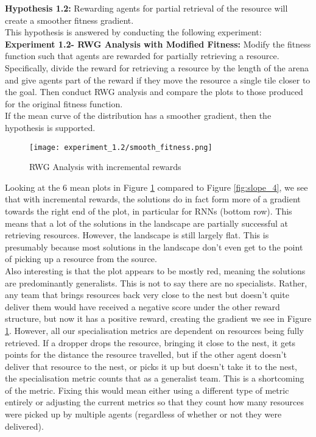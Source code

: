 \documentclass[12pt]{article}
\begin{document}
\textbf{Hypothesis 1.2:} Rewarding agents for partial retrieval of the resource will create a smoother fitness gradient.\\

This hypothesis is answered by conducting the following experiment:\\

\textbf{Experiment 1.2- RWG Analysis with Modified Fitness:}  Modify the fitness function such that agents are rewarded for partially retrieving a resource.
Specifically, divide the reward for retrieving a resource by the length of the arena and give agents part of the reward if they move the resource a single tile closer to the goal.
Then conduct RWG analysis and compare the plots to those produced for the original fitness function.\\

If the mean curve of the distribution has a smoother gradient, then the hypothesis is supported.\\

\begin{figure}[h]
\centering
\texttt{[image: experiment\_1.2/smooth\_fitness.png]}
\caption{RWG Analysis with incremental rewards}
\label{fig:incremental}
\end{figure}

Looking at the 6 mean plots in Figure \ref{fig:incremental} compared to Figure \ref{fig:slope_4}, we see that with incremental rewards, the solutions do in fact form more of a gradient towards the right end of the plot, in particular for RNNs (bottom row). 
This means that a lot of the solutions in the landscape are partially successful at retrieving resources. 
However, the landscape is still largely flat. 
This is presumably because most solutions in the landscape don't even get to the point of picking up a resource from the source.\\ 

Also interesting is that the plot appears to be mostly red, meaning the solutions are predominantly generalists.
This is not to say there are no specialists.
Rather, any team that brings resources back very close to the nest but doesn't quite deliver them would have received a negative score under the other reward structure, but now it has a positive reward, creating the gradient we see in Figure \ref{fig:incremental}.
However, all our specialisation metrics are dependent on resources being fully retrieved.
If a dropper drops the resource, bringing it close to the nest, it gets points for the distance the resource travelled, but if the other agent doesn't deliver that resource to the nest, or picks it up but doesn't take it to the nest, the specialisation metric counts that as a generalist team.
This is a shortcoming of the metric.
Fixing this would mean either using a different type of metric entirely or adjusting the current metrics so that they count how many resources were picked up by multiple agents (regardless of whether or not they were delivered).\\
\end{document}
